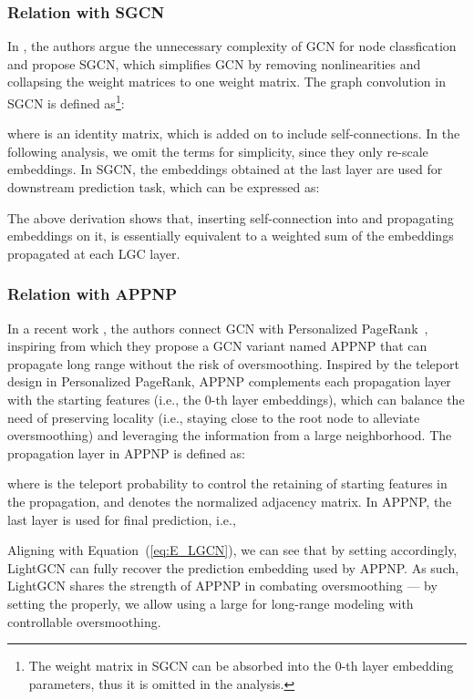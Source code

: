 \documentclass[sigconf]{acmart}
\theoremstyle{definition}
\begin{document}
\subsubsection{Relation with SGCN}\label{ss:relation-sgcn} In \cite{SGCN}, the authors argue the unnecessary complexity of GCN for node classfication and propose SGCN, which simplifies GCN by removing nonlinearities and collapsing the weight matrices to one weight matrix. The graph convolution in SGCN is defined as\footnote{The weight matrix in SGCN can be absorbed into the 0-th layer embedding parameters, thus it is omitted in the analysis.}:

where  is an identity matrix, which is added on  to include self-connections. 
In the following analysis, we omit the  terms for simplicity, since they only re-scale embeddings. In SGCN, the embeddings obtained at the last layer are used for downstream prediction task, which can be expressed as:

The above derivation shows that, inserting self-connection into  and propagating embeddings on it, is essentially equivalent to a weighted sum of the embeddings propagated at each LGC layer. 

\subsubsection{Relation with APPNP}\label{ss:APPNP} In a recent work \cite{ICLR19-APPNP}, the authors
connect GCN with Personalized PageRank~\cite{haveliwala2002topic}, inspiring from which they propose a GCN variant named APPNP that can propagate long range without the risk of oversmoothing. 
Inspired by the teleport design in Personalized PageRank, APPNP complements each propagation layer with the starting features (i.e., the 0-th layer embeddings), which can balance the need of preserving locality (i.e., staying close to the root node to alleviate oversmoothing) and leveraging the information from a large neighborhood. The propagation layer in APPNP is defined as:

where  is the teleport probability to control the retaining of starting features in the propagation, and  denotes the normalized adjacency matrix. In APPNP, the last layer is used for final prediction, i.e., 

Aligning with Equation~(\ref{eq:E_LGCN}), we can see that by setting  accordingly, LightGCN can fully recover the prediction embedding used by APPNP. 
As such, LightGCN shares the strength of APPNP in combating oversmoothing --- by setting the  properly, we allow using a large  for long-range modeling with controllable oversmoothing. 
\end{document}
